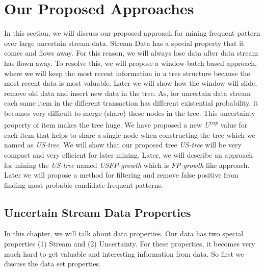 %

\chapter{Our Proposed Approaches}

In this section, we will discuss our proposed approach for mining frequent pattern over large uncertain stream data. Stream Data has a special property that it comes and flows away. For this reason, we will always lose data after data stream has flown away. To resolve this, we will propose a window-batch based approach, where we will keep the most recent information in a tree structure because the most recent data is most valuable. Later we will show how the window will slide, remove old data and insert new data in the tree. As, for uncertain data stream each same item in the different transaction has different existential probability, it becomes very difficult to merge (share) these nodes in the tree. This uncertainty property of item makes the tree huge. We have proposed a new \emph{U\textsuperscript{cap}} value for each item that helps to share a single node when constructing the tree which we named as \emph{US-tree}. We will show that our proposed tree \emph{US-tree} will be very compact and very efficient for later mining. Later, we will describe an approach for mining the \emph {US-tree} named \emph{USFP-growth} which is \emph{FP-growth} like approach. Later we will propose a method for filtering and remove false positive from finding most probable candidate frequent patterns.

\section{Uncertain Stream Data Properties}
    In this chapter, we will talk about data properties. Our data has two special properties (1) Stream and (2) Uncertainty. For these properties, it becomes very much hard to get valuable and interesting information from data. So first we discuss the data set properties.

